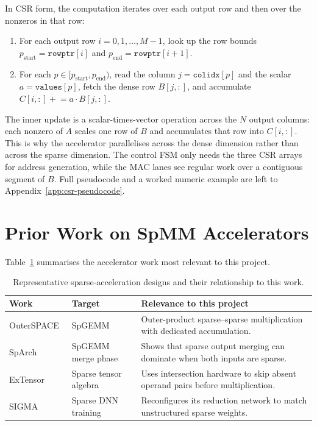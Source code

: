 In CSR form, the computation iterates over each output row and then over
the nonzeros in that row:
\begin{enumerate}
  \item For each output row $i = 0, 1, \ldots, M{-}1$, look up the row
        bounds $p_{\mathrm{start}} = \texttt{rowptr}[i]$ and
        $p_{\mathrm{end}} = \texttt{rowptr}[i{+}1]$.
  \item For each $p \in [p_{\mathrm{start}}, p_{\mathrm{end}})$, read the
        column $j = \texttt{colidx}[p]$ and the scalar
        $a = \texttt{values}[p]$, fetch the dense row $B[j, :]$, and
        accumulate $C[i, :] \mathrel{+}= a \cdot B[j, :]$.
\end{enumerate}
The inner update is a scalar-times-vector operation across the $N$ output
columns: each nonzero of $A$ scales one row of $B$ and accumulates that row
into $C[i, :]$. This is why the accelerator parallelises across the dense
dimension rather than across the sparse dimension. The control FSM only needs
the three CSR arrays for address generation, while the MAC lanes see regular
work over a contiguous segment of $B$. Full pseudocode and a worked numeric
example are left to Appendix~\ref{app:csr-pseudocode}.

\section{Prior Work on SpMM Accelerators}

Table~\ref{tab:prior-work} summarises the accelerator work most relevant to
this project.

\begin{table}[htbp]
  \centering
  \small
  \setlength{\tabcolsep}{6pt}
  \begin{tabular}{p{3.0cm}p{2.8cm}p{7cm}}
    \toprule
    Work & Target & Relevance to this project \\
    \midrule
    OuterSPACE~\citep{outerspace2018} & SpGEMM &
      Outer-product sparse--sparse multiplication with dedicated accumulation. \\
    SpArch~\citep{sparch2020} & SpGEMM merge phase &
      Shows that sparse output merging can dominate when both inputs are sparse. \\
    ExTensor~\citep{extensor2019} & Sparse tensor algebra &
      Uses intersection hardware to skip absent operand pairs before multiplication. \\
    SIGMA~\citep{sigma2020} & Sparse DNN training &
      Reconfigures its reduction network to match unstructured sparse weights. \\
    \bottomrule
  \end{tabular}
  \caption{Representative sparse-acceleration designs and their relationship to
           this work.}
  \label{tab:prior-work}
\end{table}


